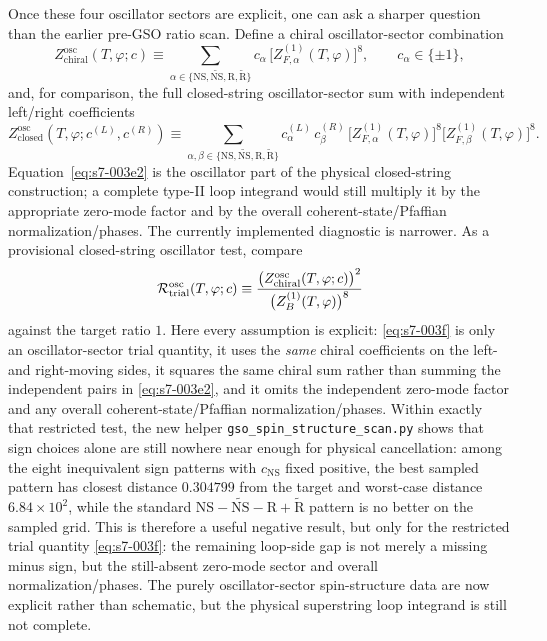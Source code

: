 \documentclass[11pt]{article}
\numberwithin{equation}{section}
\begin{document}
Once these four oscillator sectors are explicit, one can ask a sharper question than the earlier pre-GSO ratio scan. Define a chiral oscillator-sector combination
\begin{equation}
\label{eq:s7-003e}
Z_{\mathrm{chiral}}^{\mathrm{osc}}(T,\varphi;c)
\equiv
\sum_{\alpha\in\{\mathrm{NS},\widetilde{\mathrm{NS}},\mathrm{R},\widetilde{\mathrm{R}}\}}
c_\alpha\,
\bigl[Z^{(1)}_{F,\alpha}(T,\varphi)\bigr]^8,
\qquad
c_\alpha\in\{\pm1\},
\end{equation}
and, for comparison, the full closed-string oscillator-sector sum with
independent left/right coefficients
\begin{equation}
\label{eq:s7-003e2}
Z_{\mathrm{closed}}^{\mathrm{osc}}(T,\varphi;c^{(L)},c^{(R)})
\equiv
\sum_{\alpha,\beta\in\{\mathrm{NS},\widetilde{\mathrm{NS}},\mathrm{R},\widetilde{\mathrm{R}}\}}
c^{(L)}_\alpha\,c^{(R)}_\beta\,
\bigl[Z_{F,\alpha}^{(1)}(T,\varphi)\bigr]^8
\bigl[Z_{F,\beta}^{(1)}(T,\varphi)\bigr]^8.
\end{equation}
Equation~\eqref{eq:s7-003e2} is the oscillator part of the physical closed-string construction; a complete type-II loop integrand would still multiply it by the appropriate zero-mode factor and by the overall coherent-state/Pfaffian normalization/phases. The currently implemented diagnostic is narrower. As a provisional closed-string oscillator test, compare
\begin{equation}
\label{eq:s7-003f}
{\cal R}^{\mathrm{osc}}_{\mathrm{trial}}(T,\varphi;c)
\equiv
\frac{\bigl(Z_{\mathrm{chiral}}^{\mathrm{osc}}(T,\varphi;c)\bigr)^2}
{\bigl(Z_B^{(1)}(T,\varphi)\bigr)^8}
\end{equation}
against the target ratio $1$. Here every assumption is explicit: \eqref{eq:s7-003f} is only an oscillator-sector trial quantity, it uses the \emph{same} chiral coefficients on the left- and right-moving sides, it squares the same chiral sum rather than summing the independent pairs in \eqref{eq:s7-003e2}, and it omits the independent zero-mode factor and any overall coherent-state/Pfaffian normalization/phases. Within exactly that restricted test, the new helper \texttt{gso\_spin\_structure\_scan.py} shows that sign choices alone are still nowhere near enough for physical cancellation: among the eight inequivalent sign patterns with $c_{\mathrm{NS}}$ fixed positive, the best sampled pattern has closest distance $0.304799$ from the target and worst-case distance $6.84\times 10^2$, while the standard $\mathrm{NS}-\widetilde{\mathrm{NS}}-\mathrm{R}+\widetilde{\mathrm{R}}$ pattern is no better on the sampled grid. This is therefore a useful negative result, but only for the restricted trial quantity \eqref{eq:s7-003f}: the remaining loop-side gap is not merely a missing minus sign, but the still-absent zero-mode sector and overall normalization/phases. The purely oscillator-sector spin-structure data are now explicit rather than schematic, but the physical superstring loop integrand is still not complete.
\end{document}
